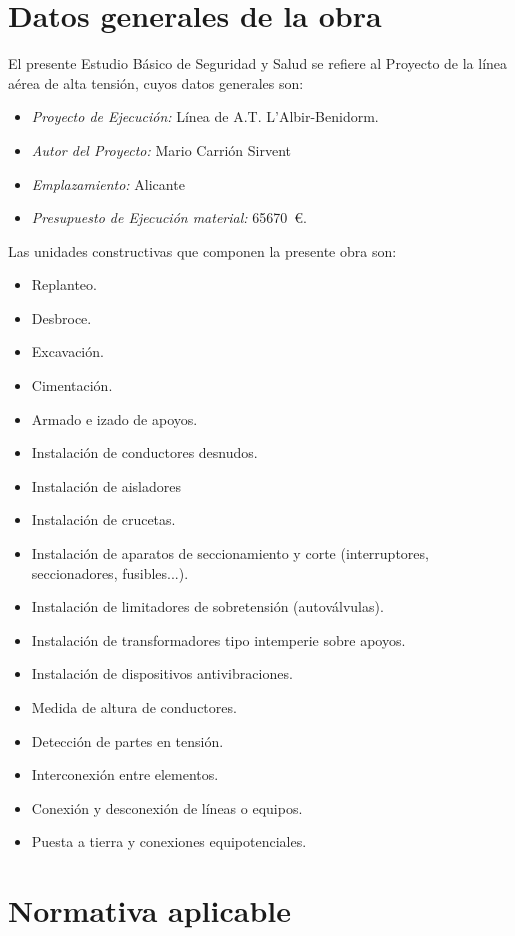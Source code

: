 \section{Datos generales de la obra}
\label{sec:sys-obra}
El presente Estudio Básico de Seguridad y Salud se refiere al Proyecto de la línea aérea de alta tensión, cuyos datos generales son:
\begin{itemize}[label=--]
    \item \textit{Proyecto de Ejecución:} Línea de A.T. L'Albir-Benidorm.
    \item \textit{Autor del Proyecto:} Mario Carrión Sirvent
    \item \textit{Emplazamiento:} Alicante
    \item \textit{Presupuesto de Ejecución material:} \SI{65670}{€}.
\end{itemize}
Las unidades constructivas que componen la presente obra son:
\begin{itemize}
    \item Replanteo.
    \item Desbroce.
    \item Excavación.
    \item Cimentación.
    \item Armado e izado de apoyos.
    \item Instalación de conductores desnudos.
    \item Instalación de aisladores
    \item Instalación de crucetas.
    \item Instalación de aparatos de seccionamiento y corte (interruptores, seccionadores, fusibles...).
    \item Instalación de limitadores de sobretensión (autoválvulas).
    \item Instalación de transformadores tipo intemperie sobre apoyos.
    \item Instalación de dispositivos antivibraciones.
    \item Medida de altura de conductores.
    \item Detección de partes en tensión.
    \item Interconexión entre elementos.
    \item Conexión y desconexión de líneas o equipos.
    \item Puesta a tierra y conexiones equipotenciales.
\end{itemize}
\section{Normativa aplicable}
\label{sec:sys-normativa}
